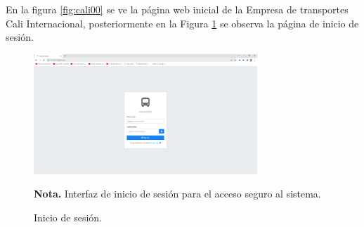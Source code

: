  
 En la figura \ref{fig:cali00} se ve la página web inicial de la Empresa de transportes Cali Internacional, posteriormente en la Figura \ref{fig:cali01} se observa la página de inicio de sesión.
 
 \vspace{0.3cm} %
 
 \begin{figure}[!h] %
 	\caption[Inicio de sesión]
 	{\newline Inicio de sesión.} %
 	\centering
 	\includegraphics[width=0.75\textwidth]{imagenes/cap_3/Img_calibus/CALIBUS01.png} %
 	
 	\begin{flushleft}
 		\begin{doublespace}
 			\hspace{1.20cm} \textbf{Nota.} Interfaz de inicio de sesión para el acceso seguro al sistema. %
 		\end{doublespace}
 	\end{flushleft}
 	\vspace{-40pt} %
 	\label{fig:cali01} %
 \end{figure}
 
